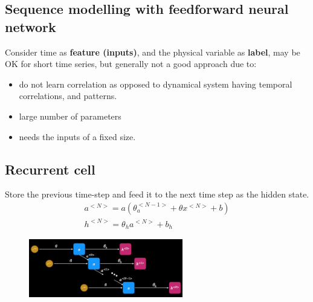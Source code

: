 \documentclass[a4paper,10pt]{article}
\begin{document}
\subsection{Sequence modelling with feedforward neural network}
Consider time as \textbf{feature (inputs)}, and the physical variable as \textbf{label}, may be OK for short time series, but generally not a good approach due to:
\begin{itemize}
    \item do not learn correlation as opposed to dynamical system having temporal correlations, and patterns. 
    \item large number of parameters
    \item needs the inputs of a fixed size. 
\end{itemize}

\subsection{Recurrent cell}
Store the previous time-step and feed it to the next time step as the hidden state.
\vspace*{0.3cm}
\begin{gather*}
    a^{<N>} = a(\theta_a^{<N-1>}+\theta x^{<N>}+b)\\
    h^{<N>} = \theta_ha^{<N>}+b_h
\end{gather*}

\vspace*{-0.3cm}
\begin{figure}[ht]
    \centering
    \includegraphics[width =0.6\textwidth]{RC.png}
\end{figure}
\end{document}
